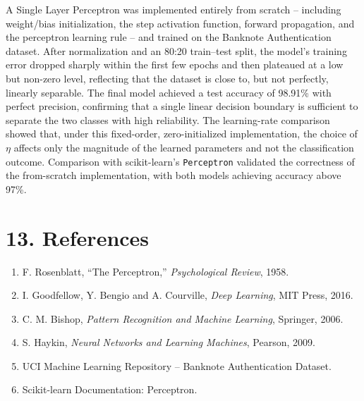 \documentclass[11pt]{article}
\begin{document}
A Single Layer Perceptron was implemented entirely from scratch -- including weight/bias initialization, the step activation function, forward propagation, and the perceptron learning rule -- and trained on the Banknote Authentication dataset. After normalization and an 80:20 train--test split, the model's training error dropped sharply within the first few epochs and then plateaued at a low but non-zero level, reflecting that the dataset is close to, but not perfectly, linearly separable. The final model achieved a test accuracy of 98.91\% with perfect precision, confirming that a single linear decision boundary is sufficient to separate the two classes with high reliability. The learning-rate comparison showed that, under this fixed-order, zero-initialized implementation, the choice of $\eta$ affects only the magnitude of the learned parameters and not the classification outcome. Comparison with scikit-learn's \texttt{Perceptron} validated the correctness of the from-scratch implementation, with both models achieving accuracy above 97\%.


\section*{13. References}

\begin{enumerate}
\item F. Rosenblatt, ``The Perceptron,'' \emph{Psychological Review}, 1958.
\item I. Goodfellow, Y. Bengio and A. Courville, \emph{Deep Learning}, MIT Press, 2016.
\item C. M. Bishop, \emph{Pattern Recognition and Machine Learning}, Springer, 2006.
\item S. Haykin, \emph{Neural Networks and Learning Machines}, Pearson, 2009.
\item UCI Machine Learning Repository -- Banknote Authentication Dataset.
\item Scikit-learn Documentation: Perceptron.
\end{enumerate}
\end{document}
